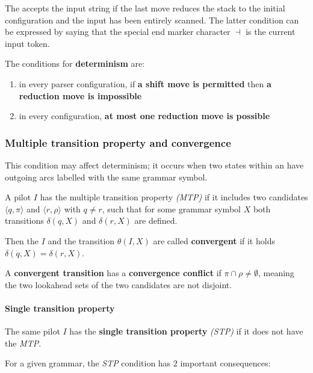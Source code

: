 \documentclass[english]{article}
\begin{document}
The \PDA accepts the input string if the last move reduces the stack to the initial configuration and the input has been entirely scanned.
The latter condition can be expressed by saying that the special end marker character \(\dashv\) is the current input token.

\bigskip
The conditions for \textbf{determinism} are:

\begin{enumerate}
  \item in every parser configuration, if \textbf{a shift move is permitted} then \textbf{a reduction move is impossible}
  \item in every configuration, \textbf{at most one reduction move is possible}
\end{enumerate}

\subsubsection{Multiple transition property and convergence}
\label{sec:multiple-transition-property-and-convergence}

This condition may affect determinism;
it occurs when two states within an \mstate have outgoing arcs labelled with the same grammar symbol.

\bigskip
A pilot \mstate \(I\) has the multiple transition property \textit{(MTP)} if it includes two candidates \(\langle q, \pi \rangle\) and \(\langle r, \rho\rangle\) with \(q \neq r\), such that for some grammar symbol \(X\) both transitions \(\delta(q, X)\) and \(\delta(r, X)\) are defined.

Then the \mstate \(I\) and the transition \(\theta(I, X)\) are called \textbf{convergent} if it holds \(\delta(q, X) = \delta(r, X)\).

A \textbf{convergent transition} has a \textbf{convergence conflict} if \(\pi \cap \rho \neq \emptyset\), meaning the two lookahead sets of the two candidates are not disjoint.

\paragraph{Single transition property}
\label{par:single-transition-property}

The same pilot \mstate \(I\) has the \textbf{single transition property} \textit{(STP)} if it does not have the \textit{MTP}.

\bigskip
For a given grammar, the \textit{STP} condition has \(2\) important consequences:
\end{document}
